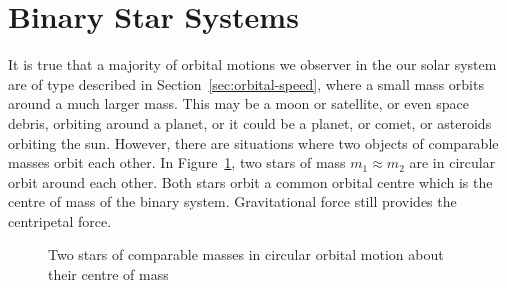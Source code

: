 \section{Binary Star Systems}
It is true that a majority of orbital motions we observer in the our solar
system are of type described in Section~\ref{sec:orbital-speed}, where a small
mass orbits around a much larger mass. This may be a moon or satellite, or even
space debris, orbiting around a planet, or it could be a planet, or comet, or
asteroids orbiting the sun. However, there are situations where two objects
of comparable masses orbit each other. In Figure~\ref{fig:binary1}, two stars of
mass $m_1\approx m_2$ are in circular orbit around each other. Both stars orbit
a common orbital centre which is the centre of mass of the binary system.
Gravitational force still provides the centripetal force.
\begin{figure}[ht]
  \centering
  \caption{Two stars of comparable masses in circular orbital motion about
    their centre of mass}
  \label{fig:binary1}
\end{figure}    

